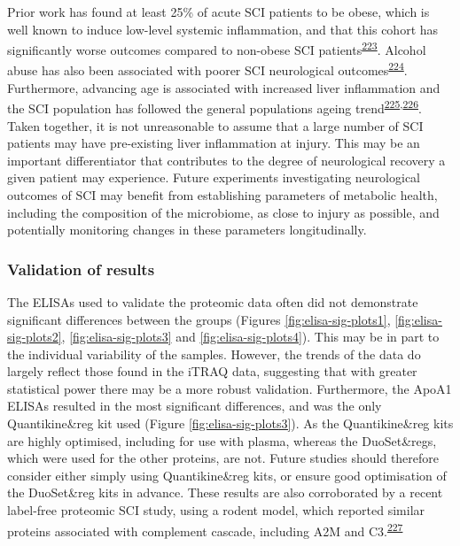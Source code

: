 \documentclass[
]{article}
\begin{document}
Prior work has found at least 25\% of acute SCI patients to be obese, which is well known to induce low-level systemic inflammation, and that this cohort has significantly worse outcomes compared to non-obese SCI patients\textsuperscript{\protect\hyperlink{ref-stenson_obesity_2011}{223}}.
Alcohol abuse has also been associated with poorer SCI neurological outcomes\textsuperscript{\protect\hyperlink{ref-elliot_alcohol_2002}{224}}.
Furthermore, advancing age is associated with increased liver inflammation and the SCI population has followed the general populations ageing trend\textsuperscript{\protect\hyperlink{ref-bertolotti_nonalcoholic_2014}{225},\protect\hyperlink{ref-chen_changing_2016}{226}}.
Taken together, it is not unreasonable to assume that a large number of SCI patients may have pre-existing liver inflammation at injury.
This may be an important differentiator that contributes to the degree of neurological recovery a given patient may experience.
Future experiments investigating neurological outcomes of SCI may benefit from establishing parameters of metabolic health, including the composition of the microbiome, as close to injury as possible, and potentially monitoring changes in these parameters longitudinally.

\hypertarget{validation-of-results}{%
\subsubsection{Validation of results}\label{validation-of-results}}

The ELISAs used to validate the proteomic data often did not demonstrate significant differences between the groups (Figures \ref{fig:elisa-sig-plots1}, \ref{fig:elisa-sig-plots2}, \ref{fig:elisa-sig-plots3} and \ref{fig:elisa-sig-plots4}).
This may be in part to the individual variability of the samples.
However, the trends of the data do largely reflect those found in the iTRAQ data, suggesting that with greater statistical power there may be a more robust validation.
Furthermore, the ApoA1 ELISAs resulted in the most significant differences, and was the only Quantikine\&reg kit used (Figure \ref{fig:elisa-sig-plots3}).
As the Quantikine\&reg kits are highly optimised, including for use with plasma, whereas the DuoSet\&regs, which were used for the other proteins, are not.
Future studies should therefore consider either simply using Quantikine\&reg kits, or ensure good optimisation of the DuoSet\&reg kits in advance.
These results are also corroborated by a recent label-free proteomic SCI study, using a rodent model, which reported similar proteins associated with complement cascade, including A2M and C3.\textsuperscript{\protect\hyperlink{ref-yao_proteomics_2021}{227}}
\end{document}
